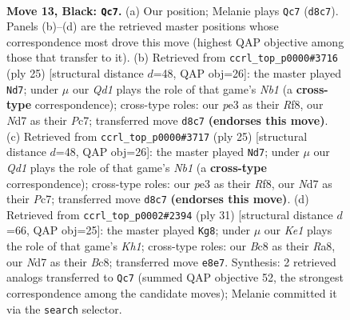 \documentclass[11pt]{article}
\begin{document}
\clearpage

\begin{figure}[p]\centering
\begin{subfigure}{0.46\textwidth}\centering
\resizebox{\linewidth}{!}{%
\newchessgame
\chessboard[
  setfen={1rbqk2r/pp1n2pp/2p5/3p2p1/3P4/2N1P3/PP2BPPP/R2Q1RK1 b k - 1 13},
  showmover=false,
  pgfstyle=straightmove, color=movearrow, markmove={d8-c7}
]}
\caption{}
\end{subfigure}\hfill
\begin{subfigure}{0.46\textwidth}\centering
\resizebox{\linewidth}{!}{%
\newchessgame
\chessboard[
  setfen={rn3rk1/ppp1qbpp/3p4/8/2PPp3/2N5/PP2BPPP/R2Q1RK1 b - - 2 13},
  showmover=false,
  pgfstyle=straightmove, color=movearrow, markmove={b8-d7}
]}
\caption{}
\end{subfigure}
\\[4pt]
\begin{subfigure}{0.46\textwidth}\centering
\resizebox{\linewidth}{!}{%
\newchessgame
\chessboard[
  setfen={rn3rk1/ppp1qbpp/3p4/8/2PPp3/2N5/PP2BPPP/R2Q1RK1 b - - 2 13},
  showmover=false,
  pgfstyle=straightmove, color=movearrow, markmove={b8-d7}
]}
\caption{}
\end{subfigure}\hfill
\begin{subfigure}{0.46\textwidth}\centering
\resizebox{\linewidth}{!}{%
\newchessgame
\chessboard[
  setfen={r1b1r2k/pp1nqpp1/2p4p/3p4/3P4/2NBP3/PPQ2PPP/1R3RK1 b - - 3 16},
  showmover=false,
  pgfstyle=straightmove, color=movearrow, markmove={h8-g8}
]}
\caption{}
\end{subfigure}
\caption{\textbf{Move 13, Black: \texttt{Qc7}.} (a) Our position; Melanie plays \texttt{Qc7} (\texttt{d8c7}). Panels (b)--(d) are the retrieved master positions whose correspondence most drove this move (highest QAP objective among those that transfer to it). (b) Retrieved from \texttt{ccrl\_top\_p0000\#3716} (ply 25) [structural distance $d$=48, QAP obj=26]: the master played \texttt{Nd7}; under $\mu$ our \emph{Qd1} plays the role of that game's \emph{Nb1} (a \textbf{cross-type} correspondence); cross-type roles: our \emph{p}e3 as their \emph{R}f8, our \emph{N}d7 as their \emph{P}c7; transferred move \texttt{d8c7} \textbf{(endorses this move)}. (c) Retrieved from \texttt{ccrl\_top\_p0000\#3717} (ply 25) [structural distance $d$=48, QAP obj=26]: the master played \texttt{Nd7}; under $\mu$ our \emph{Qd1} plays the role of that game's \emph{Nb1} (a \textbf{cross-type} correspondence); cross-type roles: our \emph{p}e3 as their \emph{R}f8, our \emph{N}d7 as their \emph{P}c7; transferred move \texttt{d8c7} \textbf{(endorses this move)}. (d) Retrieved from \texttt{ccrl\_top\_p0002\#2394} (ply 31) [structural distance $d$=66, QAP obj=25]: the master played \texttt{Kg8}; under $\mu$ our \emph{Ke1} plays the role of that game's \emph{Kh1}; cross-type roles: our \emph{B}c8 as their \emph{R}a8, our \emph{N}d7 as their \emph{B}c8; transferred move \texttt{e8e7}. Synthesis: 2 retrieved analogs transferred to \texttt{Qc7} (summed QAP objective 52, the strongest correspondence among the candidate moves); Melanie committed it via the \texttt{search} selector.}
\label{fig:thought-m25}
\end{figure}
\end{document}
